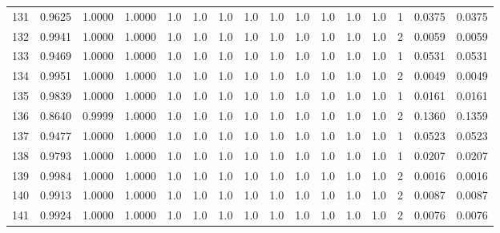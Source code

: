 \begin{tabular}{lrrrrrrrrrrrrrrr}
131 &      0.9625 &  1.0000 &  1.0000 &     1.0 &     1.0 &     1.0 &     1.0 &     1.0 &     1.0 &     1.0 &      1.0 &        1.0 &      1 &                    0.0375 &                     0.0375 \\
132 &      0.9941 &  1.0000 &  1.0000 &     1.0 &     1.0 &     1.0 &     1.0 &     1.0 &     1.0 &     1.0 &      1.0 &        1.0 &      2 &                    0.0059 &                     0.0059 \\
133 &      0.9469 &  1.0000 &  1.0000 &     1.0 &     1.0 &     1.0 &     1.0 &     1.0 &     1.0 &     1.0 &      1.0 &        1.0 &      1 &                    0.0531 &                     0.0531 \\
134 &      0.9951 &  1.0000 &  1.0000 &     1.0 &     1.0 &     1.0 &     1.0 &     1.0 &     1.0 &     1.0 &      1.0 &        1.0 &      2 &                    0.0049 &                     0.0049 \\
135 &      0.9839 &  1.0000 &  1.0000 &     1.0 &     1.0 &     1.0 &     1.0 &     1.0 &     1.0 &     1.0 &      1.0 &        1.0 &      1 &                    0.0161 &                     0.0161 \\
136 &      0.8640 &  0.9999 &  1.0000 &     1.0 &     1.0 &     1.0 &     1.0 &     1.0 &     1.0 &     1.0 &      1.0 &        1.0 &      2 &                    0.1360 &                     0.1359 \\
137 &      0.9477 &  1.0000 &  1.0000 &     1.0 &     1.0 &     1.0 &     1.0 &     1.0 &     1.0 &     1.0 &      1.0 &        1.0 &      1 &                    0.0523 &                     0.0523 \\
138 &      0.9793 &  1.0000 &  1.0000 &     1.0 &     1.0 &     1.0 &     1.0 &     1.0 &     1.0 &     1.0 &      1.0 &        1.0 &      1 &                    0.0207 &                     0.0207 \\
139 &      0.9984 &  1.0000 &  1.0000 &     1.0 &     1.0 &     1.0 &     1.0 &     1.0 &     1.0 &     1.0 &      1.0 &        1.0 &      2 &                    0.0016 &                     0.0016 \\
140 &      0.9913 &  1.0000 &  1.0000 &     1.0 &     1.0 &     1.0 &     1.0 &     1.0 &     1.0 &     1.0 &      1.0 &        1.0 &      2 &                    0.0087 &                     0.0087 \\
141 &      0.9924 &  1.0000 &  1.0000 &     1.0 &     1.0 &     1.0 &     1.0 &     1.0 &     1.0 &     1.0 &      1.0 &        1.0 &      2 &                    0.0076 &                     0.0076 \\

\end{tabular}
